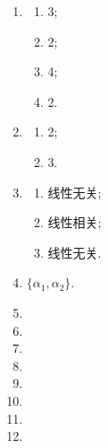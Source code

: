 \documentclass[a4paper, 11pt]{ctexart}
\begin{document}
\begin{enumerate}
    \item %
        \begin{multicols}{4}
            \begin{enumerate}[(1)]
                \item %
                    3;
                \item %
                    2;
                \item %
                    4;
                \item %
                    2.
            \end{enumerate}
        \end{multicols}
    \item %
        \begin{multicols}{2}
            \begin{enumerate}[(1)]
                \item %
                    2;
                \item %
                    3.
            \end{enumerate}
        \end{multicols}
    \item %
        \begin{multicols}{3}
            \begin{enumerate}[(1)]
                \item %
                    线性无关;
                \item %
                    线性相关;
                \item %
                    线性无关.
            \end{enumerate}
        \end{multicols}
    \item %
        $\{\alpha_1, \alpha_2\}$.
    \item %
    \item %
    \item %
    \item %
    \item %
    \item %
    \item %
    \item %
\end{enumerate}
\end{document}
